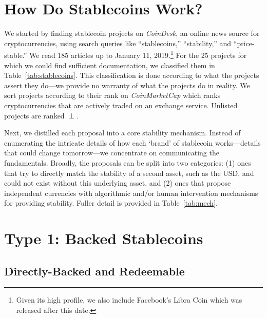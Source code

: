 

\section{How Do Stablecoins Work?}

We started by finding stablecoin projects on \textit{CoinDesk}, an online news source for cryptocurrencies, using search queries like ``stablecoins,'' ``stability,'' and ``price-stable.'' We read 185 articles up to January 11, 2019.\footnote{Given its high profile, we also include Facebook's Libra Coin which was released after this date.} For the 25 projects for which we could find sufficient documentation, we classified them in Table~\ref{tab:stablecoins}. This classification is done according to what the projects assert they do---we provide no warranty of what the projects do in reality. We sort projects according to their rank on \textit{CoinMarketCap} which ranks cryptocurrencies that are actively traded on an exchange service. Unlisted projects are ranked $\perp$.

Next, we distilled each proposal into a core stability mechanism. Instead of enumerating the intricate details of how each `brand' of stablecoin works---details that could change tomorrow---we concentrate on communicating the fundamentals. Broadly, the proposals can be split into two categories: (1) ones that try to directly match the stability of a second asset, such as the USD, and could not exist without this underlying asset, and (2) ones that propose independent currencies with algorithmic and/or human intervention mechanisms for providing stability. Fuller detail is provided in Table~\ref{tab:mech}.









\section{Type 1: Backed Stablecoins}
\label{sec:t1}

\subsection{Directly-Backed and Redeemable}
\label{sec:redeem}

